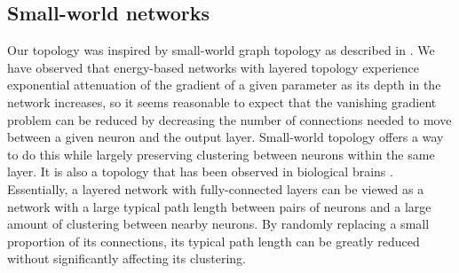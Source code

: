 \documentclass[format=sigconf]{acmart}
\begin{document}
\subsection{Small-world networks}
\label{sec:sw_background}

Our topology was inspired by small-world graph topology as described in \cite{watts98}. We have observed that energy-based networks with layered topology experience exponential attenuation of the gradient of a given parameter as its depth in the network increases, so it seems reasonable to expect that the vanishing gradient problem can be reduced by decreasing the number of connections needed to move between a given neuron and the output layer. Small-world topology offers a way to do this while largely preserving clustering between neurons within the same layer. It is also a topology that has been observed in biological brains \cite{bullmore2009}. Essentially, a layered network with fully-connected layers can be viewed as a network with a large typical path length between pairs of neurons and a large amount of clustering between nearby neurons. By randomly replacing a small proportion of its connections, its typical path length can be greatly reduced without significantly affecting its clustering.
\end{document}

